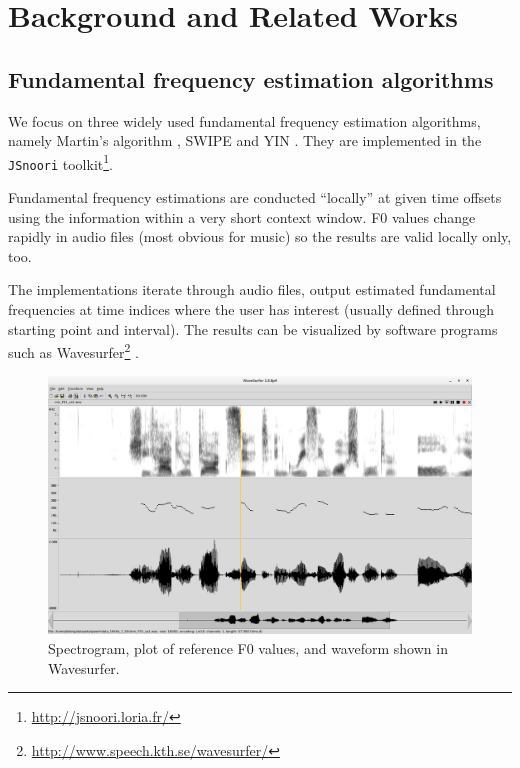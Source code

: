 \documentclass[11pt,a4paper]{report}
\begin{document}
\chapter{Background and Related Works}

\section{Fundamental frequency estimation algorithms}

We focus on three widely used fundamental frequency estimation algorithms, namely Martin's algorithm \parencite{martin1982comparison}, SWIPE \parencite{camacho2007swipe} and YIN \parencite{de2002yin}.
They are implemented in the \texttt{JSnoori} toolkit\footnote{\url{http://jsnoori.loria.fr/}}.

Fundamental frequency estimations are conducted \enquote{locally} at given time offsets using the information within a very short context window.
F0 values change rapidly in audio files (most obvious for music) so the results are valid locally only, too.

The implementations iterate through audio files, output estimated fundamental frequencies at time indices where the user has interest (usually defined through starting point and interval).
The results can be visualized by software programs such as Wavesurfer\footnote{\url{http://www.speech.kth.se/wavesurfer/}} \parencite{sjolander2000wavesurfer}.

\begin{figure}[htbp]
  \centering
  \includegraphics[width=\textwidth]{wavesurfer.png}
  \caption{Spectrogram, plot of reference F0 values, and waveform shown in Wavesurfer.} \label{fig:wavesurfer}
\end{figure}
\end{document}
